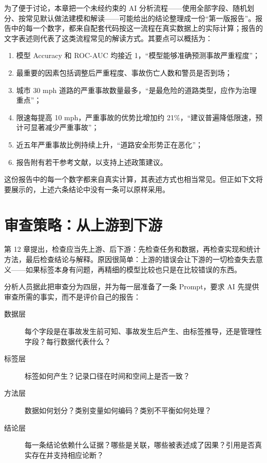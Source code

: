 为了便于讨论，本章把一个未经约束的 AI 分析流程——使用全部字段、随机划分、按常见默认做法建模和解读——可能给出的结论整理成一份“第一版报告”。报告中的每一个数字，都来自配套代码按这一流程在真实数据上的实际计算；报告的文字表述则代表了这类流程常见的解读方式。其要点可以概括为：

\begin{enumerate}
  \item 模型 Accuracy 和 ROC-AUC 均接近 1，“模型能够准确预测事故严重程度”；
  \item 最重要的因素包括调整后严重程度、事故伤亡人数和警员是否到场；
  \item 城市 30 mph 道路的严重事故数量最多，“是最危险的道路类型，应作为治理重点”；
  \item 限速每提高 10 mph，严重事故的优势比增加约 21\%，“建议普遍降低限速，预计可显著减少严重事故”；
  \item 近五年严重事故比例持续上升，“道路安全形势正在恶化”；
  \item 报告附有若干参考文献，以支持上述政策建议。
\end{enumerate}

这份报告中的每一个数字都来自真实计算，其表述方式也相当常见。但正如下文将要展示的，上述六条结论中没有一条可以原样采用。

\section{审查策略：从上游到下游}

第 12 章提出，检查应当先上游、后下游：先检查任务和数据，再检查实现和统计方法，最后检查结论与解释。原因很简单：上游的错误会让下游的一切检查失去意义——如果标签本身有问题，再精细的模型比较也只是在比较错误的东西。

分析人员据此把审查分为四层，并为每一层准备了一条 Prompt，要求 AI 先提供审查所需的事实，而不是评价自己的报告：

\begin{description}
  \item[数据层] 每个字段是在事故发生前可知、事故发生后产生、由标签推导，还是管理性字段？每行数据代表什么？
  \item[标签层] 标签如何产生？记录口径在时间和空间上是否一致？
  \item[方法层] 数据如何划分？类别变量如何编码？类别不平衡如何处理？
  \item[结论层] 每一条结论依赖什么证据？哪些是关联，哪些被表述成了因果？引用是否真实存在并支持相应论断？
\end{description}

